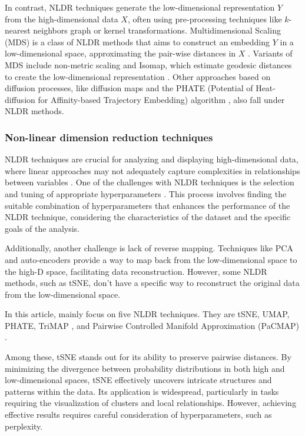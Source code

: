 \documentclass[
  12pt]{article}
\begin{document}
In contrast, NLDR techniques generate the low-dimensional representation
\(Y\) from the high-dimensional data \(X\), often using pre-processing
techniques like \(k\)-nearest neighbors graph or kernel transformations.
Multidimensional Scaling (MDS) is a class of NLDR methods that aims to
construct an embedding \(Y\) in a low-dimensional space, approximating
the pair-wise distances in \(X\) \citep{Torgerson1967}. Variants of MDS
include non-metric scaling \citep{article62} and Isomap, which estimate
geodesic distances to create the low-dimensional representation
\citep{article63}. Other approaches based on diffusion processes, like
diffusion maps \citep{article64} and the PHATE (Potential of
Heat-diffusion for Affinity-based Trajectory Embedding) algorithm
\citep{article03}, also fall under NLDR methods.

\subsubsection{Non-linear dimension reduction
techniques}\label{non-linear-dimension-reduction-techniques}

NLDR techniques are crucial for analyzing and displaying
high-dimensional data, where linear approaches may not adequately
capture complexities in relationships between variables
\citep{Johnstone2009}. One of the challenges with NLDR techniques is the
selection and tuning of appropriate hyperparameters \citep{liao2023}.
This process involves finding the suitable combination of
hyperparameters that enhances the performance of the NLDR technique,
considering the characteristics of the dataset and the specific goals of
the analysis.

Additionally, another challenge is lack of reverse mapping. Techniques
like PCA and auto-encoders \citep{article65} provide a way to map back
from the low-dimensional space to the high-D space, facilitating data
reconstruction. However, some NLDR methods, such as tSNE, don't have a
specific way to reconstruct the original data from the low-dimensional
space.

In this article, mainly focus on five NLDR techniques. They are tSNE,
UMAP, PHATE, TriMAP \citep{article02}, and Pairwise Controlled Manifold
Approximation (PaCMAP) \citep{Yingfan2021}.

Among these, tSNE \citep{Laurens2008} stands out for its ability to
preserve pairwise distances. By minimizing the divergence between
probability distributions in both high and low-dimensional spaces, tSNE
effectively uncovers intricate structures and patterns within the data.
Its application is widespread, particularly in tasks requiring the
visualization of clusters and local relationships. However, achieving
effective results requires careful consideration of hyperparameters,
such as perplexity.
\end{document}
